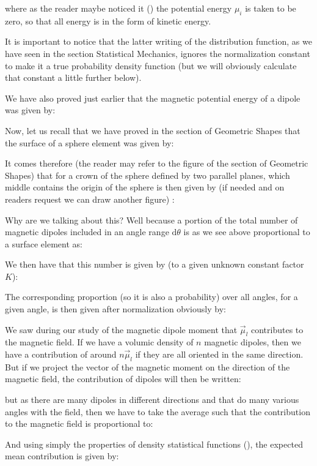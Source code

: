 	where as the reader maybe noticed it () the potential energy $\mu_i$ is taken to be zero, so that all energy is in the form of kinetic energy.
	
	It is important to notice that the latter writing  of the distribution function, as we have seen in the section Statistical Mechanics, ignores the normalization constant to make it a true probability density function (but we will obviously calculate that constant a little further below).

	We have also proved just earlier that the magnetic potential energy of a dipole was given by:
	
	Now, let us recall that we have proved in the section of Geometric Shapes that the surface of a sphere element was given by:
	
	It comes therefore (the reader may refer to the figure of the section of Geometric Shapes) that for a crown of the sphere defined by two parallel planes, which middle contains the origin of the sphere is then given by (if needed and on readers request we can draw another figure) :
	
	Why are we talking about this? Well because a portion of the total number of magnetic dipoles included in an angle range $\mathrm{d}\theta$ is as we see above proportional to a surface element as:
	
	We then have that this number is given by (to a given unknown constant factor $K$):
	
	The corresponding proportion (so it is also a probability) over all angles, for a given angle, is then given after normalization obviously by:
	
	We saw during our study of the magnetic dipole moment that $\vec{\mu}_l$ contributes to the magnetic field. If we have a volumic density of $n$ magnetic dipoles, then we have a contribution of around $n\vec{\mu}_l$ if they are all oriented in the same direction. But if we project the vector of the magnetic moment on the direction of the magnetic field, the contribution of dipoles will then be written:
	
	but as there are many dipoles in different directions and that do many various angles with the field, then we have to take the average such that the contribution to the magnetic field is proportional to:
	
	And using simply the properties of density statistical functions (), the expected mean contribution is given by:
	
